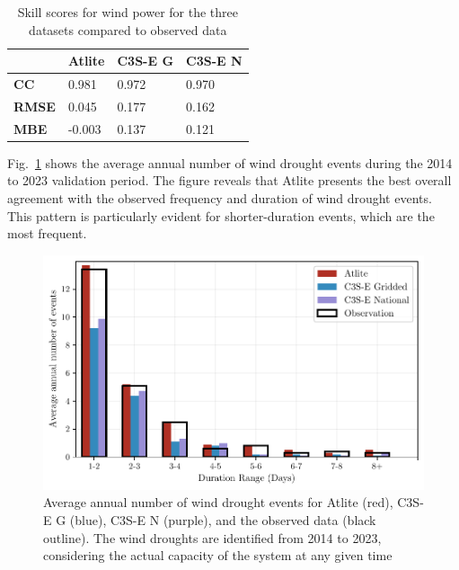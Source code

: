 \documentclass[preprint, 12pt]{elsarticle}
\begin{document}
\begin{table}[!ht]
	\centering
	\begin{tabular}{l|lll|}
		\cline{2-4}
		& \textbf{Atlite} & \textbf{C3S-E G} & \textbf{C3S-E N} \\ \hline
		\multicolumn{1}{|l|}{\textbf{CC}}   & 0.981           & 0.972            & 0.970            \\ \hline
		\multicolumn{1}{|l|}{\textbf{RMSE}} & 0.045           & 0.177            & 0.162            \\ \hline
		\multicolumn{1}{|l|}{\textbf{MBE}}   & -0.003          & 0.137            & 0.121            \\ \hline
	\end{tabular}
	\caption{Skill scores for wind power for the three datasets compared to observed data}
	\label{tab:wind_skill_scores}
\end{table}

Fig.~\ref{fig:bar_number_events_verification_wind} shows the average annual number of wind drought events during the 2014 to 2023 validation period. The figure reveals that Atlite presents the best overall agreement with the observed frequency and duration of wind drought events. This pattern is particularly evident for shorter-duration events, which are the most frequent.

\begin{figure}[!ht]
	\centering
	\includegraphics[width=\textwidth]{verification_wind_number_events.pdf}
	\caption{Average annual number of wind drought events for Atlite (red), C3S-E G (blue), C3S-E N (purple), and the observed data (black outline). The wind droughts are identified from 2014 to 2023, considering the actual capacity of the system at any given time}
	\label{fig:bar_number_events_verification_wind}
\end{figure}
\end{document}
